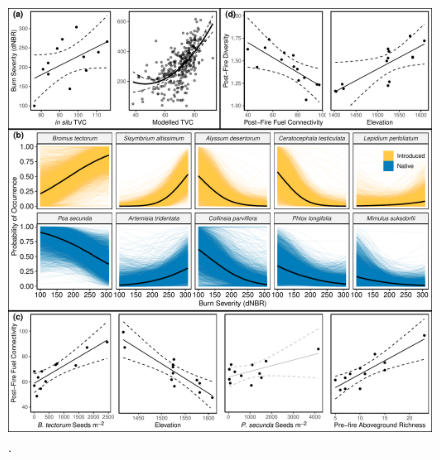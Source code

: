 \documentclass[
  12pt,
]{article}
\begin{document}
\begin{figure}
\centering
\includegraphics{images/big_plot.pdf}
\caption{.}
\end{figure}
\end{document}
